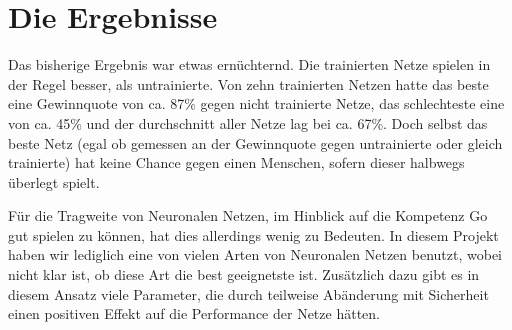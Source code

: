 \section{Die Ergebnisse}
Das bisherige Ergebnis war etwas ernüchternd. Die trainierten Netze spielen in
der Regel besser, als untrainierte. Von zehn trainierten Netzen hatte das beste 
eine Gewinnquote von ca. 87\% gegen nicht trainierte Netze, das schlechteste
eine von ca. 45\% und der durchschnitt aller Netze lag bei ca. 67\%.
Doch selbst das beste Netz (egal ob gemessen an der Gewinnquote gegen 
untrainierte oder gleich trainierte) hat keine Chance gegen einen Menschen, 
sofern dieser halbwegs überlegt spielt.

Für die Tragweite von Neuronalen Netzen, im Hinblick auf die Kompetenz Go gut
spielen zu können, hat dies allerdings wenig zu Bedeuten. In diesem Projekt
haben wir lediglich eine von vielen Arten von Neuronalen Netzen benutzt, wobei
nicht klar ist, ob diese Art die best geeignetste ist. Zusätzlich dazu gibt es
in diesem Ansatz viele Parameter, die durch teilweise Abänderung mit Sicherheit 
einen positiven Effekt auf die Performance der Netze hätten. 